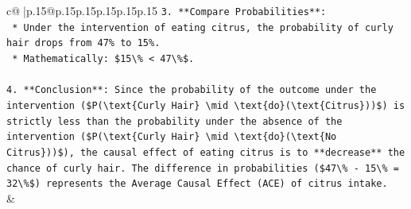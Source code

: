 \documentclass{article}
\begin{document}
{\begin{supertabular}{c@{$\;$}|p{.15\linewidth}@{}p{.15\linewidth}p{.15\linewidth}p{.15\linewidth}p{.15\linewidth}p{.15\linewidth}}
{{{\texttt{3.  **Compare Probabilities**:} \\
\texttt{    *   Under the intervention of eating citrus, the probability of curly hair drops from 47\% to 15\%.} \\
\texttt{    *   Mathematically: \$15\textbackslash{}\% < 47\textbackslash{}\%\$.} \\
\\ 
\texttt{4.  **Conclusion**: Since the probability of the outcome under the intervention (\$P(\textbackslash{}text\{Curly Hair\} \textbackslash{}mid \textbackslash{}text\{do\}(\textbackslash{}text\{Citrus\}))\$) is strictly less than the probability under the absence of the intervention (\$P(\textbackslash{}text\{Curly Hair\} \textbackslash{}mid \textbackslash{}text\{do\}(\textbackslash{}text\{No Citrus\}))\$), the causal effect of eating citrus is to **decrease** the chance of curly hair. The difference in probabilities (\$47\textbackslash{}\% {-} 15\textbackslash{}\% = 32\textbackslash{}\%\$) represents the Average Causal Effect (ACE) of citrus intake.} \\
            }
        }
    }
    & \\ \\


\end{supertabular}}
\end{document}
